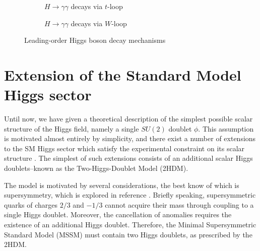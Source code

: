 \begin{figure}[h!]
\begin{subfigure}[b]{0.48\textwidth}
        \caption{$H\rightarrow \gamma\gamma$ decays via $t$-loop}
        \label{subfig:H-yy-t}
    \end{subfigure}
    \begin{subfigure}[b]{0.48\textwidth}
        \centering
        \caption{$H\rightarrow \gamma\gamma$ decays via $W$-loop}
        \label{subfig:hyy-W}
    \end{subfigure}
    \caption{Leading-order Higgs boson decay mechanisms}
    \label{fig:higgs-decays}
\end{figure} 

\section{Extension of the Standard Model Higgs sector}
\label{sect:introduce-2HDM}

Until now, we have given a theoretical description of the simplest possible scalar structure of the Higgs field, namely a single $SU(2)$ doublet $\phi$. 
This assumption is motivated almost entirely by simplicity, and there exist a number of extensions to the SM Higgs sector which satisfy the experimental constraint on its scalar structure \cite{Zyla:2020zbs}. 
The simplest of such extensions consists of an additional scalar Higgs doublets--known as the Two-Higgs-Doublet Model (2HDM). 

The model is motivated by several considerations, the best know of which is supersymmetry, which is explored in reference \cite{HABER198575}. Briefly speaking, supersymmetric quarks of charges $2/3$ and $-1/3$ cannot acquire their mass through coupling to a single Higgs doublet. Moreover, the cancellation of anomalies requires the existence of an additional Higgs doublet. Therefore, the Minimal Supersymmetric Standard Model (MSSM) must contain two Higgs doublets, as prescribed by the 2HDM.

